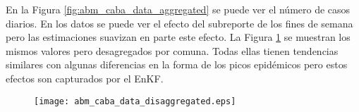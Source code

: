 En la Figura \ref{fig:abm_caba_data_aggregated} se puede ver el número de casos diarios. En los datos se puede ver el efecto del subreporte de los fines de semana pero las estimaciones suavizan en parte este efecto. La Figura \ref{fig:abm_caba_data_disaggregated} se muestran los mismos valores pero desagregados por comuna. Todas ellas tienen tendencias similares con algunas diferencias en la forma de los picos epidémicos pero estos efectos son capturados por el EnKF.

\begin{figure}[h]
    \centering
    \texttt{[image: abm\_caba\_data\_disaggregated.eps]}
    \caption{}
    \label{fig:abm_caba_data_disaggregated}
\end{figure}
